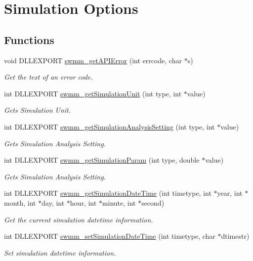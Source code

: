 \hypertarget{group___simulation_settings}{}\section{Simulation Options}
\label{group___simulation_settings}
\subsection*{Functions}
\begin{DoxyCompactItemize}
\item 
void D\+L\+L\+E\+X\+P\+O\+RT \hyperlink{group___simulation_settings_gad0599614140f8c3edb3e44fa4ce6914b}{swmm\+\_\+get\+A\+P\+I\+Error} (int errcode, char $\ast$s)
\begin{DoxyCompactList}\small\item\em Get the text of an error code. \end{DoxyCompactList}\item 
int D\+L\+L\+E\+X\+P\+O\+RT \hyperlink{group___simulation_settings_ga2c45b28a68a6661f55dd108d0ee22950}{swmm\+\_\+get\+Simulation\+Unit} (int type, int $\ast$value)
\begin{DoxyCompactList}\small\item\em Gets Simulation Unit. \end{DoxyCompactList}\item 
int D\+L\+L\+E\+X\+P\+O\+RT \hyperlink{group___simulation_settings_ga9ec64a873071a584734f8202582dbe2c}{swmm\+\_\+get\+Simulation\+Analysis\+Setting} (int type, int $\ast$value)
\begin{DoxyCompactList}\small\item\em Gets Simulation Analysis Setting. \end{DoxyCompactList}\item 
int D\+L\+L\+E\+X\+P\+O\+RT \hyperlink{group___simulation_settings_ga3f3a35c715f9d618efabb85bed6e2d08}{swmm\+\_\+get\+Simulation\+Param} (int type, double $\ast$value)
\begin{DoxyCompactList}\small\item\em Gets Simulation Analysis Setting. \end{DoxyCompactList}\item 
int D\+L\+L\+E\+X\+P\+O\+RT \hyperlink{group___simulation_settings_gac261f5224debc1ed0e92c725a1d35213}{swmm\+\_\+get\+Simulation\+Date\+Time} (int timetype, int $\ast$year, int $\ast$month, int $\ast$day, int $\ast$hour, int $\ast$minute, int $\ast$second)
\begin{DoxyCompactList}\small\item\em Get the current simulation datetime information. \end{DoxyCompactList}\item 
int D\+L\+L\+E\+X\+P\+O\+RT \hyperlink{group___simulation_settings_ga2539c5004593b674f972e757828a0759}{swmm\+\_\+set\+Simulation\+Date\+Time} (int timetype, char $\ast$dtimestr)
\begin{DoxyCompactList}\small\item\em Set simulation datetime information. \end{DoxyCompactList}\end{DoxyCompactItemize}


